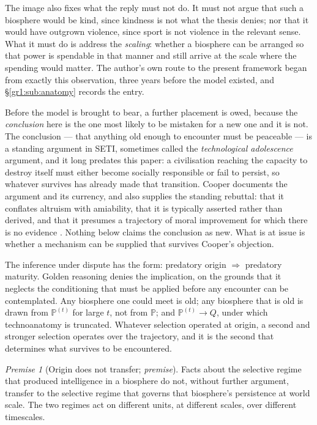 \documentclass[11pt]{article}
\numberwithin{equation}{section}
\theoremstyle{plain}
\theoremstyle{definition}
\theoremstyle{remark}
\newcommand{\PP}{\mathbb{P}}
\newtheorem{premise}{Premise}
\begin{document}
The image also fixes what the reply must not do. It must not argue that
such a biosphere would be kind, since kindness is not what the thesis
denies; nor that it would have outgrown violence, since sport is not
violence in the relevant sense. What it must do is address the
\emph{scaling}: whether a biosphere can be arranged so that power is
spendable in that manner and still arrive at the scale where the
spending would matter. The author's own route to the present framework
began from exactly this observation, three years before the model
existed, and \S\ref{gr1:sub:anatomy} records the entry.

Before the model is brought to bear, a further placement is owed,
because the \emph{conclusion} here is the one most likely to be mistaken
for a new one and it is not. The conclusion --- that anything old enough to encounter must be
peaceable --- is a standing argument in SETI, sometimes called the
\emph{technological adolescence} argument, and it long predates this
paper: a civilisation reaching the capacity to destroy itself must
either become socially responsible or fail to persist, so whatever
survives has already made that transition. Cooper documents the
argument and its currency, and also supplies the standing rebuttal: that
it conflates altruism with amiability, that it is typically asserted
rather than derived, and that it presumes a trajectory of moral
improvement for which there is no evidence \cite{Cooper19}. Nothing
below claims the conclusion as new. What is at issue is whether a
mechanism can be supplied that survives Cooper's objection.

The inference under dispute has the form: predatory origin
$\Rightarrow$ predatory maturity. Golden reasoning denies the
implication, on the grounds that it neglects the conditioning that must
be applied before any encounter can be contemplated. Any biosphere one could meet is old; any biosphere
that is old is drawn from $\PP^{(t)}$ for large $t$, not from $\PP$; and
$\PP^{(t)}\to Q$, under which technoanatomy is truncated. Whatever
selection operated at origin, a second and stronger selection operates
over the trajectory, and it is the second that determines what survives
to be encountered.

\begin{premise}[Origin does not transfer; \emph{premise}]
\label{gr:phi4}
Facts about the selective regime that produced intelligence in a
biosphere do not, without further argument, transfer to the selective
regime that governs that biosphere's persistence at world scale. The two
regimes act on different units, at different scales, over different
timescales.
\end{premise}
\end{document}
